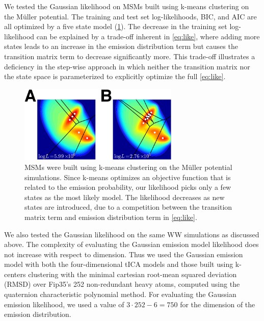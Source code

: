 \documentclass[journal=jpcbfk, layout=traditional, manuscript=article]{achemso}
\begin{document}
We tested the Gaussian likelihood on MSMs built using k-means clustering on the M\"uller potential. The training and test set log-likelihoods, BIC, and AIC are all optimized by a five state model (\cref{fig:kmeans_mull}). The decrease in the training set log-likelihood can be explained by a trade-off inherent in \cref{eq:like}, where adding more states leads to an increase in the emission distribution term but causes the transition matrix term to decrease significantly more. This trade-off illustrates a deficiency in the step-wise approach in which neither the transition matrix nor the state space is parameterized to explicitly optimize the full \cref{eq:like}.

\begin{figure}
\centering
\includegraphics[width=3in]{figs_final/kmeans_like2_lbl.png}
\caption{MSMs were built using k-means clustering on the M\"uller potential simulations. Since k-means optimizes an objective function that is related to the emission probability, our likelihood picks only a few states as the most likely model. The likelihood decreases as new states are introduced, due to a competition between the transition matrix term and emission distribution term in \cref{eq:like}.\label{fig:kmeans_mull}}
\end{figure}

We also tested the Gaussian likelihood on the same WW simulations as discussed above. The complexity of evaluating the Gaussian emission model likelihood does not increase with respect to dimension. Thus we used the Gaussian emission model with both the four-dimensional tICA models and those built using k-centers clustering with the minimal cartesian root-mean squared deviation (RMSD) over Fip35's 252 non-redundant heavy atoms, computed using the quaternion characteristic polynomial method\cite{Theobald2005Rapid}. For evaluating the Gaussian emission likelihood, we used a value of $3 \cdot 252 - 6 = 750$ for the dimension of the emission distribution.
\end{document}
